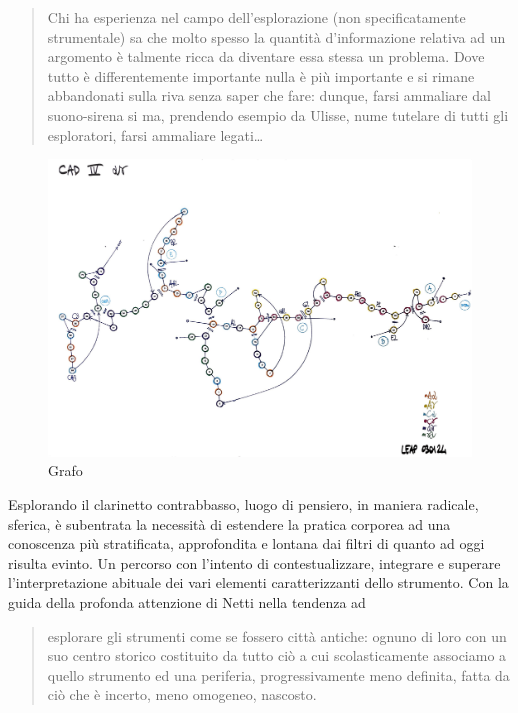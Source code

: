 \documentclass{gs-adonis}
\begin{document}
\begin{quote}
  Chi  ha  esperienza  nel  campo  dell’esplorazione  (non  specificatamente
  strumentale) sa che molto spesso la quantità d’informazione relativa ad un
  argomento  è  talmente  ricca  da  diventare  essa  stessa  un  problema.
  Dove tutto  è differentemente  importante  nulla  è  più  importante  e  si
  rimane abbandonati sulla riva senza saper che fare: dunque, farsi ammaliare dal
  suono-sirena si ma, prendendo esempio da Ulisse, nume tutelare di tutti gli
  esploratori, farsi ammaliare legati\ldots
\end{quote}

\begin{figure}[t]
  \centering
  \includegraphics[width=\linewidth]{images/CAD-IV-GRAFO-ANNOTATO.pdf}
  \captionsetup{width=.81\linewidth}
  \caption{Grafo}
  \label{grafo}
\end{figure}

Esplorando il clarinetto contrabbasso, luogo di pensiero, in maniera radicale,
sferica, è subentrata la necessità di estendere la pratica corporea ad una
conoscenza più stratificata, approfondita e lontana dai filtri di quanto ad oggi
risulta evinto. Un percorso con l'intento di contestualizzare, integrare e superare
l’interpretazione abituale dei vari elementi caratterizzanti dello strumento.
Con la guida della profonda attenzione di Netti nella tendenza ad

\begin{quote}
  esplorare gli strumenti come se fossero città antiche: ognuno di loro con un
  suo centro storico costituito da tutto ciò a cui scolasticamente associamo a
  quello strumento ed una periferia, progressivamente meno definita, fatta da
  ciò che è incerto, meno omogeneo, nascosto.
\end{quote}
\end{document}
